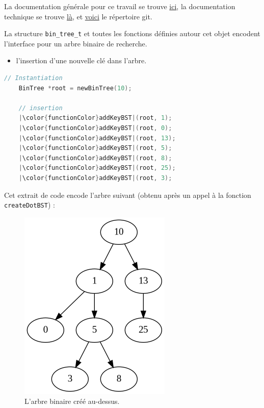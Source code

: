 \documentclass[10pt]{article} %
\begin{document}
\vspace{1cm}

La documentation générale pour ce travail se trouve \href{https://polytech-sorbonne-main-tp2.readthedocs.io/en/latest/}{ici}, la documentation
technique se trouve \href{https://ejovo13.github.io/DSA_TP1/}{là}, et \href{https://github.com/ejovo13/DSA_TP1}{voici} le répertoire git.

\vspace{1cm}
\noindent {} 

La structure \texttt{bin\_tree\_t} et toutes les fonctions définies autour cet objet encodent l'interface pour un arbre
binaire de recherche.

\begin{itemize}
    \item[\ding{43}] l'insertion d'une nouvelle clé dans l'arbre.
\end{itemize}

\begin{lstlisting}[language=C, keywordstyle=\color{objectPurp}, otherkeywords={root}]
    // Instantiation
    BinTree *root = newBinTree(10);

    // insertion
    |\color{functionColor}addKeyBST|(root, 1);
    |\color{functionColor}addKeyBST|(root, 0);
    |\color{functionColor}addKeyBST|(root, 13);
    |\color{functionColor}addKeyBST|(root, 5);
    |\color{functionColor}addKeyBST|(root, 8);
    |\color{functionColor}addKeyBST|(root, 25);
    |\color{functionColor}addKeyBST|(root, 3);
\end{lstlisting}

Cet extrait de code encode l'arbre suivant (obtenu après un appel à la fonction \texttt{createDotBST}) :

\begin{figure}[h!]
    \centering
    \includegraphics[width=.25\textwidth]{media/bintree.png}
    \caption{L'arbre binaire créé au-dessus.}
    \label{fig:first_tree}
\end{figure}
\end{document}
